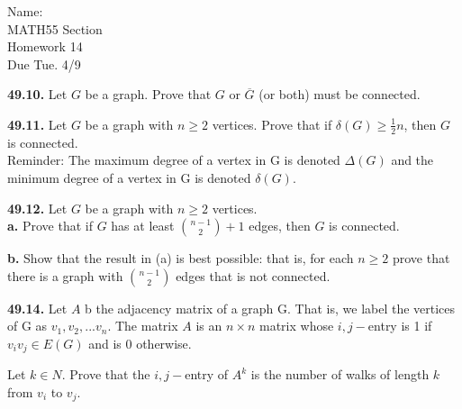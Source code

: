 \documentclass[10pt]{article}
\begin{document}
\begin{flushright}
	Name: \underline{\hspace{3cm}} \\
	MATH55 Section \underline{\hspace{0.5cm}} \\
	Homework 14 \\
	Due Tue. 4/9
\end{flushright}


\begin{framed}
	\textbf{49.10.} Let $G$ be a graph. Prove that $G$ or 
	$\overline{G}$ (or both) must be connected.
\end{framed}

\pagebreak

\begin{framed}
	\textbf{49.11.} Let $G$ be a graph with $n \geq 2$ vertices. Prove that
	if $\delta(G) \geq \frac{1}{2}n$, then $G$ is connected.\\

	Reminder: The maximum degree of a vertex in G is denoted $\Delta(G)$
	and the minimum degree of a vertex in G is denoted $\delta(G)$.
\end{framed}

\pagebreak

\begin{framed}
	\textbf{49.12.} Let $G$ be a graph with $n \geq 2$ vertices.\\

	\textbf{a.} Prove that if $G$ has at least $\binom{n-1}{2}+1$ edges,
	then $G$ is connected.

	\textbf{b.} Show that the result in (a) is best possible: that is, for
	each $n \geq 2$ prove that there is a graph with $\binom{n-1}{2}$ edges that is
	not connected.
\end{framed}

\pagebreak

\begin{framed}
	\textbf{49.14.} Let $A$ b the adjacency matrix of a graph G. That is,
	we label the vertices of G as $v_1, v_2,...v_n$. The matrix $A$ is an
	$n \times n$ matrix whose $i,j-$entry is 1 if $v_iv_j \in E(G)$ and is $0$
	otherwise.

	Let $k \in N$. Prove that the $i,j-$entry of $A^k$ is the number of walks of length
	$k$ from $v_i$ to $v_j$.
\end{framed}
\end{document}
